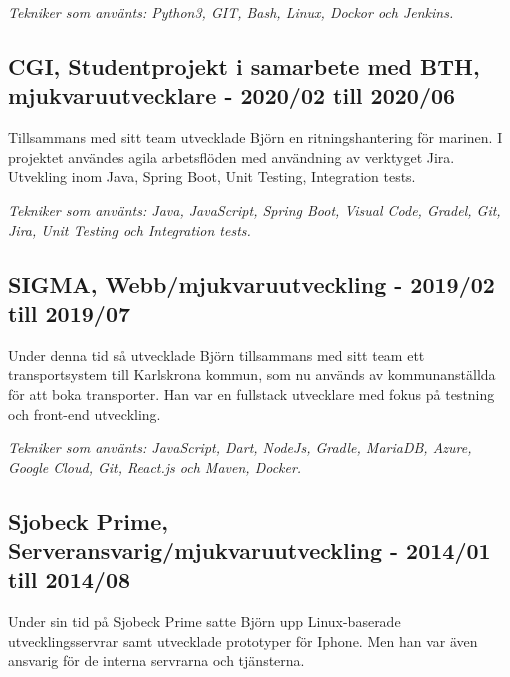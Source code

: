\begin{minipage}[t]{0.9\textwidth}
    \vspace{5pt}\textit{Tekniker som använts: Python3, GIT, Bash, Linux, Dockor och Jenkins.}
  
    \vspace{15pt} %
    \subsection*{\textcolor{colorTitelErfarenhet}{CGI, Studentprojekt i samarbete med BTH, mjukvaruutvecklare - 2020/02 till 2020/06}}
    Tillsammans med sitt team utvecklade Björn en ritningshantering för marinen. 
    I projektet användes agila arbetsflöden med användning av verktyget Jira. 
    Utvekling inom Java, Spring Boot, Unit Testing, Integration tests.
    
    \vspace{5pt}\textit{Tekniker som använts: Java, JavaScript, Spring Boot, Visual Code, Gradel, Git, Jira, Unit Testing och Integration tests.} 
    
    \vspace{15pt} %
    \subsection*{\textcolor{colorTitelErfarenhet}{SIGMA, Webb/mjukvaruutveckling - 2019/02 till 2019/07}}
    Under denna tid så utvecklade Björn tillsammans med sitt team ett transportsystem 
    till Karlskrona kommun, som nu används av kommunanställda för att boka transporter. 
    Han var en fullstack utvecklare med fokus på testning och front-end utveckling.
    
    \vspace{5pt}\textit{Tekniker som använts: JavaScript, Dart, NodeJs, Gradle, MariaDB, Azure, Google Cloud, Git, React.js och Maven, Docker.} 
    
  
    \vspace{15pt} %
    \subsection*{\textcolor{colorTitelErfarenhet}{Sjobeck Prime, Serveransvarig/mjukvaruutveckling - 2014/01 till 2014/08}}
    Under sin tid på Sjobeck Prime satte Björn upp Linux-baserade utvecklingsservrar samt utvecklade 
    prototyper för Iphone. Men han var även ansvarig för de interna servrarna och tjänsterna.
    

\end{minipage}
